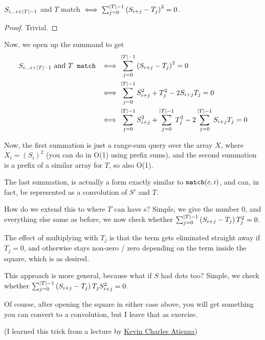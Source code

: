 		\begin{claim}
			$S_{i\dots i + \mid T\mid - 1}$ and $T$ match $\iff
			\sum_{j = 0}^{\mid T\mid - 1} \left(S_{i + j} - T_{j}\right) ^ 2 = 0$.
		\end{claim}

		\begin{proof}
			Trivial.
		\end{proof}

		Now, we open up the summand to get
		\begin{align*}
			S_{i\dots i + \mid T\mid - 1} \text{ and } T \texttt{ match }
			&\iff
			\sum_{j = 0}^{\mid T\mid - 1} \left(S_{i + j} - T_{j}\right) ^ 2 = 0 \\
			&\iff
			\sum_{j = 0}^{\mid T\mid - 1} S_{i + j}^2 + T_{j}^2 - 2S_{i + j}T_j = 0\\
			&\iff
			\sum_{j = 0}^{\mid T\mid - 1} S_{i +j}^2 + 
			\sum_{j = 0}^{\mid T\mid - 1} T_j^2 -
			2\sum_{j = 0}^{\mid T\mid - 1} S_{i + j}T_j = 0\\
		\end{align*}

		Now, the first summation is just a range-sum query over the array
		$X$, where $X_i = \left(S_i\right)^2$ (you can do in O(1) using prefix sums),
		and the second summation is a prefix of a similar array for $T$, so also O(1).

		The last summation, is actually a form exactly similar to $\texttt{match}(c, i)$,
		and can, in fact, be represented as a convolution of $S'$ and $T$.

		How do we extend this to where $T$ can have s?
		Simple, we give  the number $0$, and everything else same as before,
		we now check whether 
		$\sum_{j = 0}^{\mid T\mid - 1} \left(S_{i + j} - T_{j}\right)T_j ^ 2 = 0$.

		The effect of multiplying with $T_j$ is that the term gets eliminated straight
		away if $T_j = 0$, and otherwise stays non-zero / zero depending on the term
		inside the square, which is as desired.

		This approach is more general, because what if $S$ had dots too?
		Simple, we check whether
		$\sum_{j = 0}^{\mid T\mid - 1} \left(S_{i + j} - T_{j}\right)T_jS_{i + j} ^ 2 = 0$.

		Of course, after opening the square in either case above, you will get something you
		can convert to a convolution, but I leave that as exercise.

		(I learned this trick from a lecture by
		\href{http://codeforces.com/profile/kevinsogo}{Kevin Charles Atienza})

